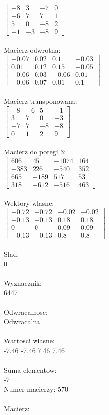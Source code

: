 \documentclass[a4paper,12pt]{article}
\begin{document}
$\begin{bmatrix} -8&3&-7&0\\-6&7&7&1\\5&0&-8&2\\-1&-3&-8&9 \end{bmatrix}$
\\
\\
Macierz odwrotna:\\

$\begin{bmatrix} -0.07&0.02&0.1&-0.03\\0.01&0.12&0.15&-0.05\\-0.06&0.03&-0.06&0.01\\-0.06&0.07&0.01&0.1 \end{bmatrix}$
\\
\\
Macierz transponowana:\\

$\begin{bmatrix} -8&-6&5&-1\\3&7&0&-3\\-7&7&-8&-8\\0&1&2&9 \end{bmatrix}$
\\
\\
Macierz do potegi 3:\\

$\begin{bmatrix} 606&45&-1074&164\\-383&226&-540&352\\665&-189&517&53\\318&-612&-516&463 \end{bmatrix}$
\\
\\
Wektory wlasne:\\

$\begin{bmatrix} -0.72&-0.72&-0.02&-0.02\\-0.13&-0.13&0.18&0.18\\0&0&0.09&0.09\\-0.13&-0.13&0.8&0.8 \end{bmatrix}$
\\
\\
Slad:\\
0
\\
\\
Wyznacznik:\\
6447
\\
\\
Odwracalnosc:\\
Odwracalna
\\
\\
Wartosci wlasne:\\
-7.46 -7.46 7.46 7.46
\\
\\
Suma elementow:\\
-7
\\
\newpage
Numer macierzy:
570
\\
\\
Macierz:\\
\end{document}
